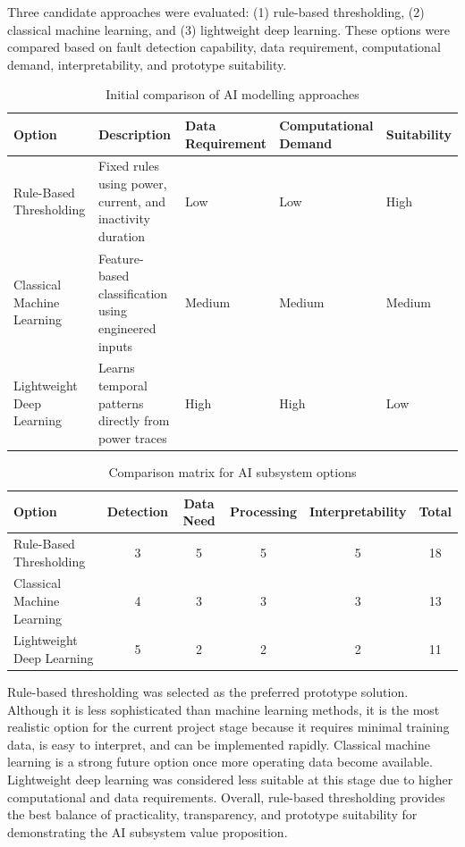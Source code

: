 \documentclass[11pt, twoside, a4paper]{article}
\begin{document}
Three candidate approaches were evaluated: (1) rule-based thresholding, (2) classical machine learning, and (3) lightweight deep learning. These options were compared based on fault detection capability, data requirement, computational demand, interpretability, and prototype suitability.

\begin{table}[H]
\centering
\renewcommand{\arraystretch}{1.15}
\begin{tabular}{|p{2cm}|p{4cm}|p{2cm}|p{3cm}|p{2cm}|}
\hline
\textbf{Option} & \textbf{Description} & \textbf{Data Requirement} & \textbf{Computational Demand} & \textbf{Suitability} \\ \hline
Rule-Based Thresholding & Fixed rules using power, current, and inactivity duration & Low & Low & High \\ \hline
Classical Machine Learning & Feature-based classification using engineered inputs & Medium & Medium & Medium \\ \hline
Lightweight Deep Learning & Learns temporal patterns directly from power traces & High & High & Low \\ \hline
\end{tabular}
\caption{Initial comparison of AI modelling approaches}
\label{tab:ai_options}
\end{table}

\begin{table}[H]
\centering
\renewcommand{\arraystretch}{1.15}
\begin{tabular}{|p{3cm}|c|c|c|c|c|}
\hline
\textbf{Option} & \textbf{Detection} & \textbf{Data Need} & \textbf{Processing} & \textbf{Interpretability} & \textbf{Total} \\ \hline
Rule-Based Thresholding & 3 & 5 & 5 & 5 & 18 \\ \hline
Classical Machine Learning & 4 & 3 & 3 & 3 & 13 \\ \hline
Lightweight Deep Learning & 5 & 2 & 2 & 2 & 11 \\ \hline
\end{tabular}
\caption{Comparison matrix for AI subsystem options}
\label{tab:ai_trade}
\end{table}

Rule-based thresholding was selected as the preferred prototype solution. Although it is less sophisticated than machine learning methods, it is the most 
realistic option for the current project stage because it requires minimal training data, is easy to interpret, and can be implemented rapidly. Classical 
machine learning is a strong future option once more operating data become available. Lightweight deep learning was considered less suitable at this stage 
due to higher computational and data requirements. Overall, rule-based thresholding provides the best balance of practicality, transparency, and prototype 
suitability for demonstrating the AI subsystem value proposition.



\printbibliography
\end{document}
